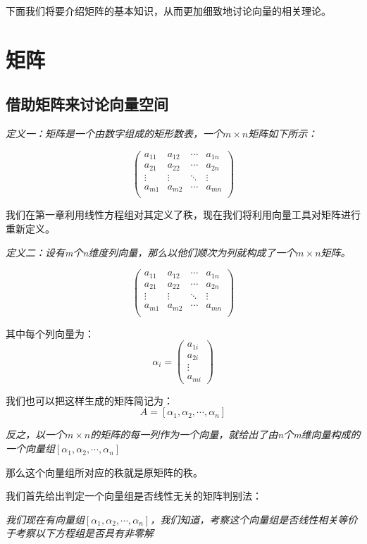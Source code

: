 \documentclass[a4paper]{ctexart}
\begin{document}
下面我们将要介绍矩阵的基本知识，从而更加细致地讨论向量的相关理论。

\section{矩阵}
\subsection{借助矩阵来讨论向量空间}
\textit{定义一：矩阵是一个由数字组成的矩形数表，一个$m\times n$矩阵如下所示：}

$$
\begin{pmatrix}
a_{11}&a_{12}&\cdots&a_{1n}\\
a_{21}&a_{22}&\cdots&a_{2n}\\
\vdots&\vdots&\ddots&\vdots\\
a_{m1}&a_{m2}&\cdots&a_{mn}\\
\end{pmatrix}
$$

我们在第一章利用线性方程组对其定义了秩，现在我们将利用向量工具对矩阵进行重新定义。

\textit{定义二：设有m个n维度列向量，那么以他们顺次为列就构成了一个$m\times n$矩阵。}

$$
\left(
\begin{array}{c|c|c|c}
a_{11}&a_{12}&\cdots&a_{1n}\\
a_{21}&a_{22}&\cdots&a_{2n}\\
\vdots&\vdots&\ddots&\vdots\\
a_{m1}&a_{m2}&\cdots&a_{mn}\\
\end{array}
\right)
$$

其中每个列向量为：
$$
\alpha_{i}
=
\left(
\begin{array}{c}
  a_{1i}\\
  a_{2i}\\
  \vdots\\
  a_{mi}
\end{array}
\right)
$$

我们也可以把这样生成的矩阵简记为：
$$
A=[\alpha_{1},\alpha_{2},\cdots,\alpha_{n}]
$$

\textit{反之，以一个$m\times n$的矩阵的每一列作为一个向量，就给出了由n个m维向量构成的一个向量组$[\alpha_{1},\alpha_{2},\cdots,\alpha_{n}]$}

那么这个向量组所对应的秩就是原矩阵的秩。

我们首先给出判定一个向量组是否线性无关的矩阵判别法：

\textit{我们现在有向量组$[\alpha_{1},\alpha_{2},\cdots,\alpha_{n}]$，我们知道，考察这个向量组是否线性相关等价于考察以下方程组是否具有非零解}
\end{document}
